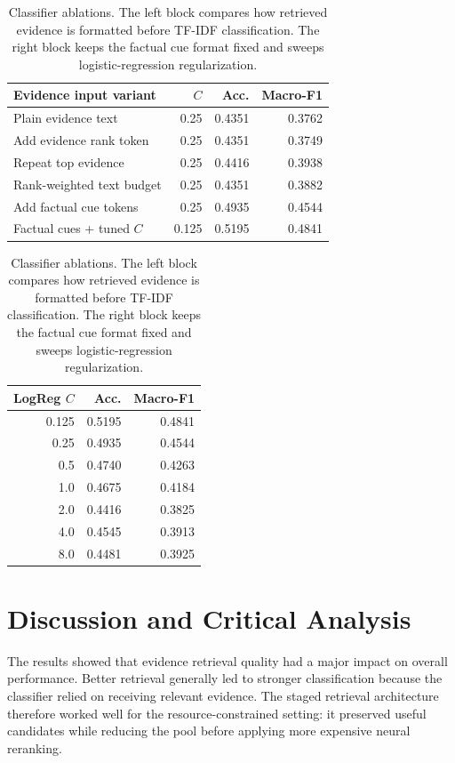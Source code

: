 \documentclass[11pt]{article}
\begin{document}
\begin{table}[t]
\centering
\scriptsize
\renewcommand{\arraystretch}{0.88}
\begin{minipage}[t]{0.62\textwidth}
\centering
\begin{tabular}{lrrr}
\toprule
Evidence input variant & $C$ & Acc. & Macro-F1 \\
\midrule
Plain evidence text & 0.25 & 0.4351 & 0.3762 \\
Add evidence rank token & 0.25 & 0.4351 & 0.3749 \\
Repeat top evidence & 0.25 & 0.4416 & 0.3938 \\
Rank-weighted text budget & 0.25 & 0.4351 & 0.3882 \\
Add factual cue tokens & 0.25 & 0.4935 & 0.4544 \\
Factual cues + tuned $C$ & 0.125 & 0.5195 & 0.4841 \\
\bottomrule
\end{tabular}
\end{minipage}
\hfill
\begin{minipage}[t]{0.32\textwidth}
\centering
\begin{tabular}{rrr}
\toprule
LogReg $C$ & Acc. & Macro-F1 \\
\midrule
0.125 & 0.5195 & 0.4841 \\
0.25 & 0.4935 & 0.4544 \\
0.5 & 0.4740 & 0.4263 \\
1.0 & 0.4675 & 0.4184 \\
2.0 & 0.4416 & 0.3825 \\
4.0 & 0.4545 & 0.3913 \\
8.0 & 0.4481 & 0.3925 \\
\bottomrule
\end{tabular}
\end{minipage}
\caption{Classifier ablations.  The left block compares how retrieved evidence
is formatted before TF-IDF classification.  The right block keeps the factual
cue format fixed and sweeps logistic-regression regularization.}
\label{tab:classifier-ablation}
\end{table}

\section{Discussion and Critical Analysis}

The results showed that evidence retrieval quality had a major impact on
overall performance. Better retrieval generally led to stronger classification
because the classifier relied on receiving relevant evidence. The staged
retrieval architecture therefore worked well for the resource-constrained
setting: it preserved useful candidates while reducing the pool before applying
more expensive neural reranking.
\end{document}
